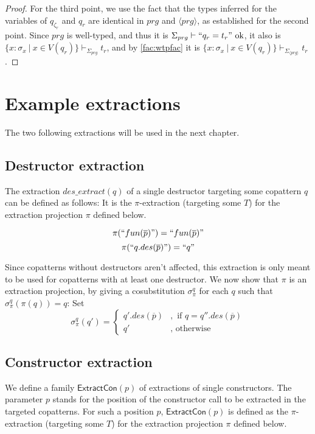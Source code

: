 \begin{lemma}
\begin{proof}
For the third point, we use the fact that the types inferred for the variables of $q_{\zeta_r}$ and $q_r$ are identical in $prg$ and $\langle prg \rangle$, as established for the second point. Since $prg$ is well-typed, and thus it is $\Sigma_{prg} \vdash `` q_r = t_r " \textrm{ ok}$, it also is $\{ x : \sigma_x ~ | ~ x \in V(q_r) \} \vdash_{\Sigma_{prg}} t_r$, and by \autoref{fac:wtpfac} it is $\{ x : \sigma_x ~ | ~ x \in V(q_r) \} \vdash_{\Sigma_{\langle prg \rangle}} t_r$.
\end{proof}
\end{lemma}

\section{Example extractions}
\label{sec:extrex}

The two following extractions will be used in the next chapter.

\subsection{Destructor extraction}

The extraction $des\_extract(q)$ of a single destructor targeting some copattern $q$ can be defined as follows: It is the $\pi$-extraction (targeting some $T$) for the extraction projection $\pi$ defined below.

\[
\pi(`` fun(\overline{p}) ") = `` fun(\overline{p}) "
\]
\[
\pi(`` q.des(\overline{p}) ") = `` q "
\]

Since copatterns without destructors aren't affected, this extraction is only meant to be used for copatterns with at least one destructor. We now show that $\pi$ is an extraction projection, by giving a cosubstitution $\sigma^q_\pi$ for each $q$ such that $\sigma^q_\pi(\pi(q)) = q$: Set
\[
\sigma^q_\pi(q') = \begin{cases}
                              q'.des(\overline{p}) &,\text{ if } q = q''.des(\overline{p}) \\
                              q' &,\text{ otherwise}
                              \end{cases}
\]

\subsection{Constructor extraction}

We define a family $\textsf{ExtractCon}(p)$ of extractions of single constructors. The parameter $p$ stands for the position of the constructor call to be extracted in the targeted copatterns. For such a position $p$, $\textsf{ExtractCon}(p)$ is defined as the $\pi$-extraction (targeting some $T$) for the extraction projection $\pi$ defined below.


